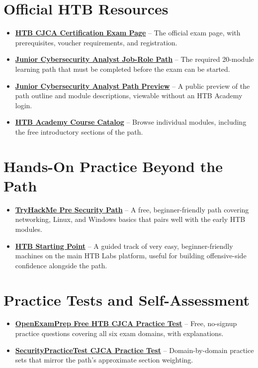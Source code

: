 \documentclass[11pt,letterpaper]{article}
\begin{document}
\section{Official HTB Resources}
\begin{itemize}
\item \textbf{\href{https://academy.hackthebox.com/app/exams/7}{HTB CJCA Certification Exam Page}} -- The official exam page, with prerequisites, voucher requirements, and registration.
\item \textbf{\href{https://academy.hackthebox.com/app/paths/424/details}{Junior Cybersecurity Analyst Job-Role Path}} -- The required 20-module learning path that must be completed before the exam can be started.
\item \textbf{\href{https://academy.hackthebox.com/path/preview/junior-cybersecurity-analyst}{Junior Cybersecurity Analyst Path Preview}} -- A public preview of the path outline and module descriptions, viewable without an HTB Academy login.
\item \textbf{\href{https://academy.hackthebox.com/}{HTB Academy Course Catalog}} -- Browse individual modules, including the free introductory sections of the path.
\end{itemize}

\section{Hands-On Practice Beyond the Path}
\begin{itemize}
\item \textbf{\href{https://tryhackme.com/path/outline/presecurity}{TryHackMe Pre Security Path}} -- A free, beginner-friendly path covering networking, Linux, and Windows basics that pairs well with the early HTB modules.
\item \textbf{\href{https://help.hackthebox.com/en/articles/6007919-introduction-to-starting-point}{HTB Starting Point}} -- A guided track of very easy, beginner-friendly machines on the main HTB Labs platform, useful for building offensive-side confidence alongside the path.
\end{itemize}

\section{Practice Tests and Self-Assessment}
\begin{itemize}
\item \textbf{\href{https://open-exam-prep.com/practice/htb-cjca}{OpenExamPrep Free HTB CJCA Practice Test}} -- Free, no-signup practice questions covering all six exam domains, with explanations.
\item \textbf{\href{https://securitypracticetest.com/hack-the-box-htb-certified-junior-cybersecurity-associate-htb-cjca-practice-test/}{SecurityPracticeTest CJCA Practice Test}} -- Domain-by-domain practice sets that mirror the path's approximate section weighting.
\end{itemize}
\end{document}
